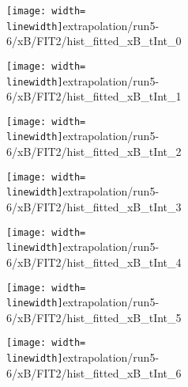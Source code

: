 \begin{figure}
\begin{subfigure}{0.45\linewidth}
\texttt{[image: width=\\linewidth]}{extrapolation/run5-6/xB/FIT2/hist_fitted_xB_tInt_0}
\end{subfigure}
\begin{subfigure}{0.45\linewidth}
\texttt{[image: width=\\linewidth]}{extrapolation/run5-6/xB/FIT2/hist_fitted_xB_tInt_1}
\end{subfigure}
\begin{subfigure}{0.45\linewidth}
\texttt{[image: width=\\linewidth]}{extrapolation/run5-6/xB/FIT2/hist_fitted_xB_tInt_2}
\end{subfigure}
\begin{subfigure}{0.45\linewidth}
\texttt{[image: width=\\linewidth]}{extrapolation/run5-6/xB/FIT2/hist_fitted_xB_tInt_3}
\end{subfigure}
\begin{subfigure}{0.45\linewidth}
\texttt{[image: width=\\linewidth]}{extrapolation/run5-6/xB/FIT2/hist_fitted_xB_tInt_4}
\end{subfigure}
\begin{subfigure}{0.45\linewidth}
\texttt{[image: width=\\linewidth]}{extrapolation/run5-6/xB/FIT2/hist_fitted_xB_tInt_5}
\end{subfigure}
\begin{subfigure}{0.45\linewidth}
\texttt{[image: width=\\linewidth]}{extrapolation/run5-6/xB/FIT2/hist_fitted_xB_tInt_6}
\end{subfigure}
\end{figure}
